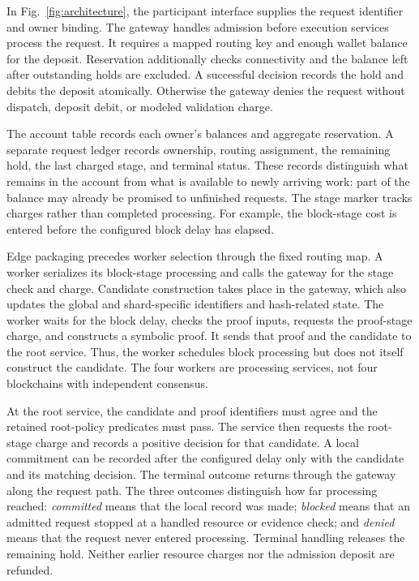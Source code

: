 In Fig.~\ref{fig:architecture}, the participant interface supplies the request
identifier and owner binding. The gateway handles admission before execution
services process the request. It requires a mapped routing key and enough
wallet balance for the deposit. Reservation additionally checks connectivity
and the balance left after outstanding holds are excluded. A successful
decision records the hold and debits the deposit atomically. Otherwise the
gateway denies the request without dispatch, deposit debit, or modeled
validation charge.

The account table records each owner's balances and aggregate reservation.
A separate request ledger records ownership, routing assignment, the remaining
hold, the last charged stage, and terminal status. These records distinguish
what remains in the account from what is available to newly arriving work:
part of the balance may already be promised to unfinished requests. The stage
marker tracks charges rather than completed processing. For example, the
block-stage cost is entered before the configured block delay has elapsed.

Edge packaging precedes worker selection through the fixed routing map. A
worker serializes its block-stage processing and calls the gateway for the
stage check and charge. Candidate construction takes place in the gateway,
which also updates the global and shard-specific identifiers and hash-related
state. The worker waits for the block delay, checks the proof inputs, requests
the proof-stage charge, and constructs a symbolic proof. It sends that proof
and the candidate to the root service. Thus, the worker schedules block
processing but does not itself construct the candidate. The four workers
are processing services, not four blockchains with independent consensus.

At the root service, the candidate and proof identifiers must agree and the
retained root-policy predicates must pass. The service then requests the
root-stage charge and records a positive decision for that candidate. A local
commitment can be recorded after the configured delay only with the candidate
and its matching decision. The terminal outcome returns through the gateway
along the request path. The three outcomes distinguish how far processing
reached: \emph{committed} means that the local record was made;
\emph{blocked} means that an admitted request stopped at a handled resource
or evidence check; and \emph{denied} means that the request never entered
processing. Terminal handling releases the remaining hold. Neither earlier
resource charges nor the admission deposit are refunded.

